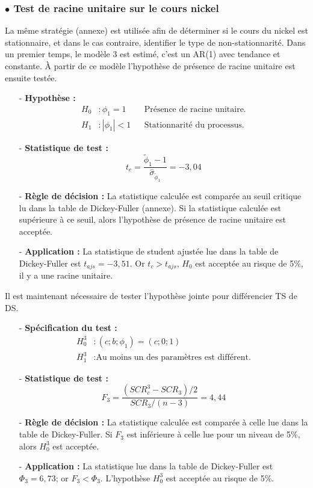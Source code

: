 \subsubsection*{$\bullet$ Test de racine unitaire sur le cours nickel}
%
La même stratégie (annexe) est utilisée afin de déterminer si le cours du nickel est stationnaire, et dans le cas contraire, identifier le type de non-stationnarité.
Dans un premier temps, le modèle 3 est estimé, c'est un AR(1) avec tendance et constante. À partir de ce modèle l'hypothèse de présence de racine unitaire est ensuite 
testée.
%
\begin{itemize}
\item[-]\textbf{ Hypothèse :} 
\begin{align*}
    H_{0} &: \phi_{1} = 1  & &\text{Présence de racine unitaire.}\\
    H_{1} &:|\phi_{1}| < 1   &  &\text{Stationnarité du processus.}
\end{align*}
\item[-]\textbf{Statistique de test :} 
\begin{equation*}
    t_{c} = \frac{\tilde{\phi}_{1}- 1}{\hat{\sigma}_{\tilde{\phi}_{1}}} = -3,04
\end{equation*}
\item[-]\textbf{Règle de décision :} La statistique calculée est comparée au seuil critique lu dans la table de Dickey-Fuller (annexe). Si la statistique calculée est supérieure à ce seuil, alors l'hypothèse de présence de racine unitaire est acceptée.
\item[-]\textbf{Application :} La statistique de student ajustée lue dans la table de Dickey-Fuller est $t_{ajs} = - 3,51$. Or $t_{c} > t_{ajs}$, $H_{0}$ est acceptée 
au risque de 5\%, il y a une racine unitaire.
\end{itemize}
%
Il est maintenant nécessaire de tester l'hypothèse jointe pour différencier TS de DS.
%
\begin{itemize}
\item[-]\textbf{Spécification du test :} 
\begin{equation*}
    \begin{split}
        H_{0}^{3} &: (c; b; \phi_{1}) = (c;0;1)\\
        H_{1}^{3} &: \text{Au moins un des paramètres est différent.}
    \end{split}
\end{equation*}
\item[-]\textbf{Statistique de test :} 
\begin{equation*}
    F_{3} = \frac{(SCR_{c}^{3} - SCR_{3})/2}{SCR_{3}/(n-3)} = 4,44
\end{equation*}
\item[-]\textbf{Règle de décision :} La statistique calculée est comparée à celle lue dans la table de Dickey-Fuller. Si $F_{3}$ est inférieure à celle lue pour un niveau 
de 5\%, alors $H_{0}^{3}$ est acceptée.
\item[-]\textbf{Application :} La statistique lue dans la table de Dickey-Fuller est $\Phi_{3} = 6,73$; or $F_{3} < \Phi_{3}$. L'hypothèse $H_{0}^{3}$ est acceptée au 
risque de 5\%.
\end{itemize}

